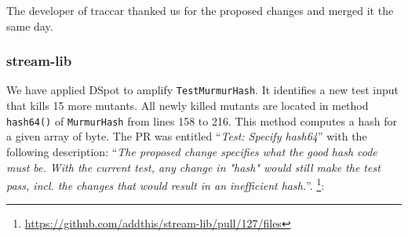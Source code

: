 \documentclass[table,xcdraw,smallextended]{svjour3}
\newcommand{\dspot}{DSpot\xspace}
\begin{document}
The developer of traccar thanked us for the proposed changes and merged it the same day.


\subsubsection{stream-lib}



We have applied \dspot to amplify \texttt{TestMurmurHash}. It identifies a new test input that kills 15 more mutants.
All newly killed mutants are located in method \texttt{hash64()} of \texttt{MurmurHash} from lines 158 to 216. This method computes a hash for a given array of byte. The PR was entitled ``\emph{Test: Specify hash64}'' with the following description: ``\emph{The proposed change specifies what the good hash code must be. With the current test, any change in "hash" would still make the test pass, incl. the changes that would result in an inefficient hash.}''. \footnote{\url{https://github.com/addthis/stream-lib/pull/127/files}}:
\begin{figure}[H]
    \centering{}
\end{figure}
\end{document}
